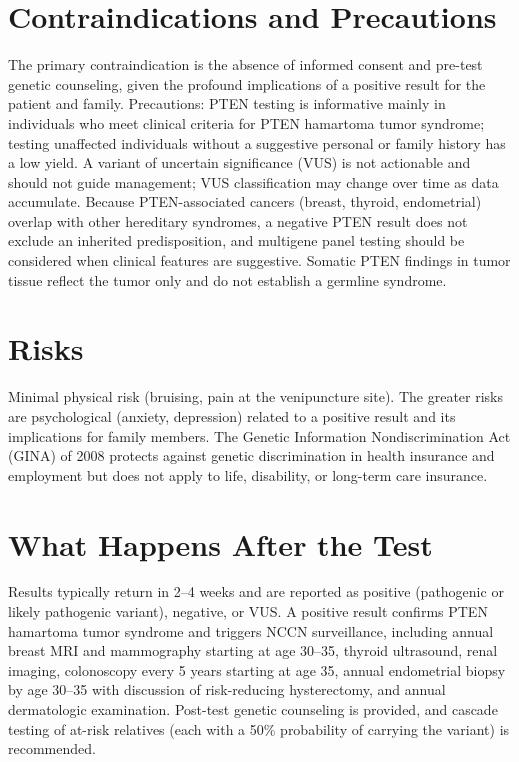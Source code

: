 \section*{Contraindications and Precautions}
The primary contraindication is the absence of informed consent and pre-test genetic counseling, given the profound implications of a positive result for the patient and family. Precautions: PTEN testing is informative mainly in individuals who meet clinical criteria for PTEN hamartoma tumor syndrome; testing unaffected individuals without a suggestive personal or family history has a low yield. A variant of uncertain significance (VUS) is not actionable and should not guide management; VUS classification may change over time as data accumulate. Because PTEN-associated cancers (breast, thyroid, endometrial) overlap with other hereditary syndromes, a negative PTEN result does not exclude an inherited predisposition, and multigene panel testing should be considered when clinical features are suggestive. Somatic PTEN findings in tumor tissue reflect the tumor only and do not establish a germline syndrome.

\section*{Risks}
Minimal physical risk (bruising, pain at the venipuncture site). The greater risks are psychological (anxiety, depression) related to a positive result and its implications for family members. The Genetic Information Nondiscrimination Act (GINA) of 2008 protects against genetic discrimination in health insurance and employment but does not apply to life, disability, or long-term care insurance.

\section*{What Happens After the Test}
Results typically return in 2--4 weeks and are reported as positive (pathogenic or likely pathogenic variant), negative, or VUS. A positive result confirms PTEN hamartoma tumor syndrome and triggers NCCN surveillance, including annual breast MRI and mammography starting at age 30--35, thyroid ultrasound, renal imaging, colonoscopy every 5 years starting at age 35, annual endometrial biopsy by age 30--35 with discussion of risk-reducing hysterectomy, and annual dermatologic examination. Post-test genetic counseling is provided, and cascade testing of at-risk relatives (each with a 50\% probability of carrying the variant) is recommended.

